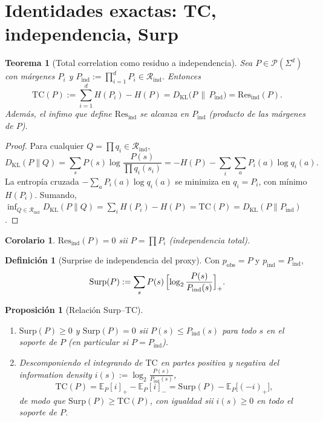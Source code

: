 \documentclass[11pt,a4paper]{article}
\theoremstyle{definition}
\newtheorem{definition}{Definici\'on}[section]
\theoremstyle{plain}
\newtheorem{proposition}{Proposici\'on}[section]
\newtheorem{theorem}{Teorema}[section]
\newtheorem{corollary}{Corolario}[section]
\theoremstyle{remark}
\newcommand{\Res}{\mathrm{Res}}
\newcommand{\TC}{\mathrm{TC}}
\newcommand{\Surp}{\mathrm{Surp}}
\newcommand{\Rind}{\mathcal{R}_{\mathrm{ind}}}
\newcommand{\KL}{D_{\mathrm{KL}}}
\begin{document}
\section{Identidades exactas: TC, independencia, Surp}
\label{sec:identities}

\begin{theorem}[Total correlation como residuo a independencia]
\label{thm:TC}
Sea $P\in\mathcal{P}(\Sigma^d)$ con m\'argenes $P_i$ y
$P_{\mathrm{ind}}:=\prod_{i=1}^d P_i\in\Rind$. Entonces
\begin{equation}
\label{eq:TC_KL}
\TC(P)
:=\sum_{i=1}^d H(P_i)-H(P)
=\KL\bigl(P\,\|\,P_{\mathrm{ind}}\bigr)
=\Res_{\mathrm{ind}}(P).
\end{equation}
Adem\'as, el infimo que define $\Res_{\mathrm{ind}}$ se alcanza en
$P_{\mathrm{ind}}$ (producto de las m\'argenes \emph{de} $P$).
\end{theorem}

\begin{proof}
Para cualquier $Q=\prod q_i\in\Rind$,
\[
\KL(P\|Q)
=\sum_s P(s)\log\frac{P(s)}{\prod q_i(s_i)}
= -H(P)-\sum_i\sum_{a}P_i(a)\log q_i(a).
\]
La entrop\'ia cruzada $-\sum_a P_i(a)\log q_i(a)$ se minimiza en $q_i=P_i$,
con m\'inimo $H(P_i)$. Sumando,
$\inf_{Q\in\Rind}\KL(P\|Q)=\sum_i H(P_i)-H(P)=\TC(P)=\KL(P\|P_{\mathrm{ind}})$.
\end{proof}

\begin{corollary}
\label{cor:Res_ind_zero}
$\Res_{\mathrm{ind}}(P)=0$ sii $P=\prod P_i$ (independencia total).
\end{corollary}

\begin{definition}[Surprise de independencia del proxy]
\label{def:Surp}
Con $p_{\mathrm{obs}}=P$ y $p_{\mathrm{ind}}=P_{\mathrm{ind}}$,
\begin{equation}
\label{eq:Surp}
\Surp(P)
:=\sum_{s}P(s)\,
\Bigl[\log_2\frac{P(s)}{P_{\mathrm{ind}}(s)}\Bigr]_+.
\end{equation}
\end{definition}

\begin{proposition}[Relaci\'on Surp--TC]
\label{prop:Surp_TC}
\begin{enumerate}[label=(\roman*)]
  \item $\Surp(P)\ge 0$ y $\Surp(P)=0$ sii $P(s)\le P_{\mathrm{ind}}(s)$
  para todo $s$ en el soporte de $P$ (en particular si $P=P_{\mathrm{ind}}$).
  \item Descomponiendo el integrando de $\TC$ en partes positiva y
  negativa del information density
  $i(s):=\log_2\frac{P(s)}{P_{\mathrm{ind}}(s)}$,
  \begin{equation}
  \TC(P)=\mathbb{E}_P[i]_+-\mathbb{E}_P[i]_-
  =\Surp(P)-\mathbb{E}_P\bigl[(-i)_+\bigr],
  \end{equation}
  de modo que $\Surp(P)\ge\TC(P)$, con igualdad sii $i(s)\ge 0$ en todo el
  soporte de $P$.
\end{enumerate}
\end{proposition}
\end{document}
